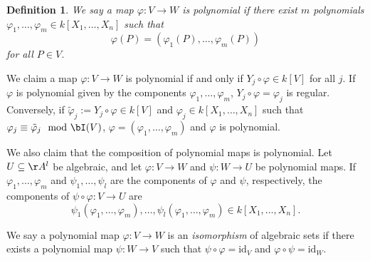 \documentclass[12pt]{amsart}
\theoremstyle{plain}
\newtheorem{definition}[theorem]{Definition}
\begin{document}
\begin{definition}
We say a map $\varphi : V \to W$ is polynomial if there exist $m$ polynomials $\varphi_1, \ldots, \varphi_m \in k[X_1, \ldots, X_n]$ such that
$$\varphi(P) = (\varphi_1(P), \ldots, \varphi_m(P))$$
for all $P \in V$.
\end{definition}

We claim a map $\varphi: V \to W$ is polynomial if and only if $Y_j \circ \varphi \in k[V]$ for all $j$.
If $\varphi$ is polynomial given by the components $\varphi_1, \ldots, \varphi_m$, $Y_j \circ \varphi = \varphi_j$ is regular.
Conversely, if $\tilde \varphi_j := Y_j \circ \varphi \in k[V]$ and $\varphi_j \in k[X_1, \ldots, X_n]$ such that $\varphi_j \equiv \tilde \varphi_j \mod \bI(V)$, $\varphi = (\varphi_1, \ldots, \varphi_m)$ and $\varphi$ is polynomial.

We also claim that the composition of polynomial maps is polynomial.
Let $U \subseteq \AA^l$ be algebraic, and let $\varphi: V \to W$ and $\psi : W \to U$ be polynomial maps.
If $\varphi_1, \ldots, \varphi_m$ and $\psi_1, \ldots, \psi_l$ are the components of $\varphi$ and $\psi$, respectively, the components of $\psi \circ \varphi : V \to U$ are
$$\psi_1(\varphi_1, \ldots, \varphi_m), \ldots, \psi_l(\varphi_1, \ldots, \varphi_m) \in k[X_1, \ldots, X_n].$$

We say a polynomial map $\varphi : V \to W$ is an \emph{isomorphism} of algebraic sets if there exists a polynomial map $\psi: W \to V$ such that $\psi \circ \varphi = \mathrm{id}_V$ and $\varphi \circ \psi = \mathrm{id}_W$.
\end{document}
